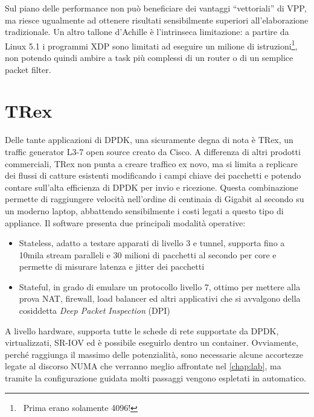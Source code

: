 Sul piano delle performance non può beneficiare dei vantaggi ``vettoriali'' di VPP, ma riesce ugualmente ad ottenere risultati sensibilmente superiori all'elaborazione tradizionale. Un altro tallone d'Achille è l'intrinseca limitazione: a partire da Linux 5.1 i programmi XDP sono limitati ad eseguire un milione di istruzioni\footnote{\ Prima erano solamente 4096!}, non potendo quindi ambire a task più complessi di un router o di un semplice packet filter.

\section{TRex}

Delle tante applicazioni di DPDK, una sicuramente degna di nota è TRex, un traffic generator L3-7 open source creato da Cisco. A differenza di altri prodotti commerciali, TRex non punta a creare traffico ex novo, ma si limita a replicare dei flussi di catture esistenti modificando i campi chiave dei pacchetti e potendo contare sull'alta efficienza di DPDK per invio e ricezione. Questa combinazione permette di raggiungere velocità nell'ordine di centinaia di Gigabit al secondo su un moderno laptop, abbattendo sensibilmente i costi legati a questo tipo di appliance. Il software presenta due principali modalità operative:

\begin{itemize}
    \item Stateless, adatto a testare apparati di livello 3 e tunnel, supporta fino a \mbox{10mila} stream paralleli e 30 milioni di pacchetti al secondo per core e permette di misurare latenza e jitter dei pacchetti
    \item Stateful, in grado di emulare un protocollo livello 7, ottimo per mettere alla prova NAT, firewall, load balancer ed altri applicativi che si avvalgono della cosiddetta \textit{Deep Packet Inspection} (DPI)
\end{itemize}

A livello hardware, supporta tutte le schede di rete supportate da DPDK,  virtualizzati, SR-IOV ed è possibile eseguirlo dentro un container. Ovviamente, perché raggiunga il massimo delle potenzialità, sono necessarie alcune accortezze legate al discorso NUMA che verranno meglio affrontate nel \cref{chap:lab}, ma tramite la configurazione guidata molti passaggi vengono espletati in automatico.